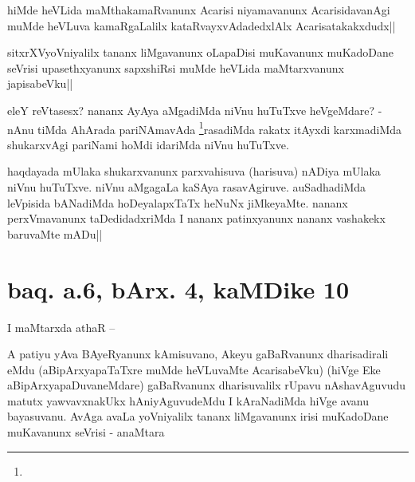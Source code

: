 \stext


\begin{artha}
hiMde heVLida maMthakamaRvanunx Acarisi niyamavanunx AcarisidavanAgi 
muMde heVLuva kamaRgaLalilx kataRvayxvAdadedxlAlx Acarisatakakxdudx||
\end{artha}


\begin{artha}
sitxrXVyoVniyalilx tananx liMgavanunx oLapaDisi muKavanunx muKadoDane 
seVrisi upasethxyanunx sapxshiRsi muMde heVLida maMtarxvanunx 
japisabeVku||
\end{artha}


\begin{artha}
eleY reVtasesx? nananx AyAya aMgadiMda niVnu huTuTxve heVgeMdare? - 
nAnu tiMda AhArada pariNAmavAda \footnote[1]{}rasadiMda rakatx itAyxdi 
karxmadiMda shukarxvAgi pariNami hoMdi idariMda niVnu huTuTxve.
\end{artha}


\begin{artha}
haqdayada mUlaka shukarxvanunx parxvahisuva (harisuva) nADiya mUlaka 
niVnu huTuTxve. niVnu aMgagaLa kaSAya rasavAgiruve. auSadhadiMda 
leVpisida bANadiMda hoDeyalapxTaTx heNuNx jiMkeyaMte. nananx 
perxVmavanunx taDedidadxriMda I nananx patinxyanunx nananx vashakekx 
baruvaMte mADu||
\end{artha}

\section*{baq. a.6, bArx. 4, kaMDike 10}

\stext

\begin{artha}
I maMtarxda athaR --
\end{artha}

\begin{artha}
A patiyu yAva BAyeRyanunx kAmisuvano, Akeyu gaBaRvanunx dharisadirali 
eMdu (aBipArxyapaTaTxre muMde heVLuvaMte AcarisabeVku) (hiVge Eke 
aBipArxyapaDuvaneMdare) gaBaRvanunx dharisuvalilx rUpavu nAshavAguvudu 
matutx yawvavxnakUkx hAniyAguvudeMdu I kAraNadiMda hiVge avanu 
bayasuvanu. AvAga avaLa yoVniyalilx tananx liMgavanunx irisi 
muKadoDane muKavanunx seVrisi - anaMtara
\end{artha}

